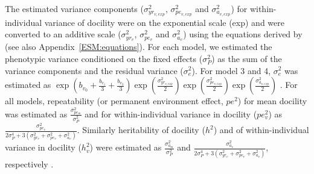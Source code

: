 \documentclass[a4paper,12pt,twoside]{article}
\begin{document}
	The estimated variance components ($\sigma_{yr_{v,exp}}^2$, $\sigma_{pe_{v,exp}}^2$ and $\sigma_{a_{v,exp}}^2$) for within-individual variance of docility were on the exponential scale (exp) and were converted to an additive scale ($\sigma_{yr_v}^2$, $\sigma_{pe_v}^2$ and $\sigma_{a_v}^2$) using the equations derived by \cite{mulder_prediction_2007} (see also Appendix~\ref{ESM:equations}).
	For each model, we estimated the phenotypic variance conditioned on the fixed effects ($\sigma_P^2$) as the sum of the variance components and the residual variance ($\sigma_e^2$).
	For model 3 and 4, $\sigma_e^2$ was estimated as $\exp \left( b_{v_0} + \frac{b_{v_1}}{3}+ \frac{b_{v_2}}{3} \right) \exp \left( \frac{\sigma_{yr_{v,exp}}^2}{2} \right) \exp \left( \frac{\sigma_{pe_{v,exp}}^2}{2} \right) \exp \left( \frac{\sigma_{a_{v,exp}}^2}{2} \right)$ \citep[Appendix~\ref{ESM:equations};][]{felleki_estimation_2012,sae-lim_genetic_2015}.
	For all models, repeatability (or permanent environment effect, $pe^2$) for mean docility was estimated as $\frac{\sigma_{pe_m}^2}{ \sigma_P^2 }$ and for within-individual variance in docility ($pe_v^2$) as $\frac{\sigma_{pe_v}^2}{2\sigma_P^4+3(\sigma_{yr_v}^2+ \sigma_{pe_v}^2 + \sigma_{a_v}^2)}$.
	Similarly heritability of docility ($h^2$) and of within-individual variance in docility ($h_v^2$) were estimated as $\frac{\sigma_{a_m}^2}{ \sigma_P^2 }$ and $\frac{\sigma_{a_v}^2}{2\sigma_P^4+3(\sigma_{yr_v}^2+ \sigma_{pe_v}^2 + \sigma_{a_v}^2)}$, respectively \citep[Appendix~\ref{ESM:equations};][]{mulder_prediction_2007}.
	
\end{document}
